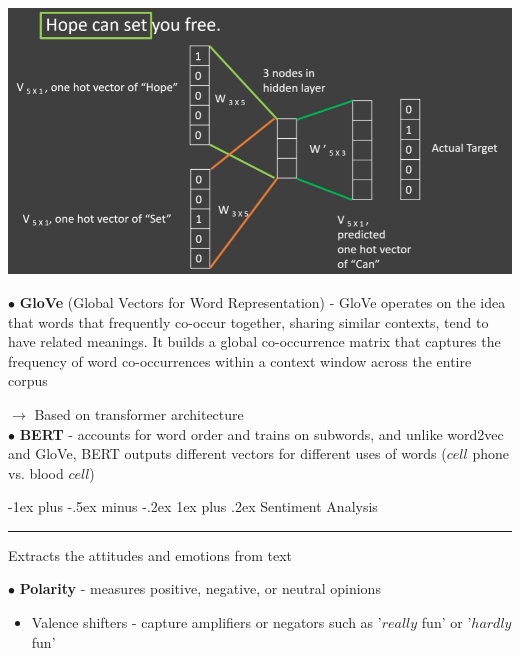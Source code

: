 \documentclass[letterpaper, 10.5pt,landscape]{article}
\makeatletter
\renewcommand{\subsubsection}{\@startsection{subsubsection}{3}{0mm}%
                                {-1ex plus -.5ex minus -.2ex}%
                                {1ex plus .2ex}%
                                {\normalfont\small\bfseries}}
\makeatother
\begin{document}
\begin{multicols*}{3}
\vspace{-5pt}
\begin{center}
    \begin{minipage}{1\linewidth}
    \includegraphics[width=\textwidth]{figures/nlp_CBOW.png}
    \end{minipage}
\end{center}
\vspace{-5pt}



\vspace{3pt}
$\bullet$ \textbf{GloVe} (Global Vectors for Word Representation) - GloVe operates on the idea that words that frequently co-occur together, sharing similar contexts, tend to have related meanings. It builds a global co-occurrence matrix that captures the frequency of word co-occurrences within a context window across the entire corpus


\vspace{3pt}
$\rightarrow$ Based on transformer architecture  \\
$\bullet$ \textbf{BERT} - accounts for word order and trains on subwords, and unlike word2vec and GloVe, BERT outputs different vectors for different uses of words ($cell$ phone vs. blood $cell$)





\subsubsection{Sentiment Analysis}  {\color{teal}\hrule height 0.5pt} \smallskip
Extracts the attitudes and emotions from text

$\bullet$ \textbf{Polarity} - measures positive, negative, or neutral opinions
\begin{itemize}[label={--},leftmargin=4mm]
\vspace{-3pt}
\item Valence shifters - capture amplifiers or negators such as '$really$ fun' or '$hardly$ fun'
\end{itemize}



\end{multicols*}
\end{document}
